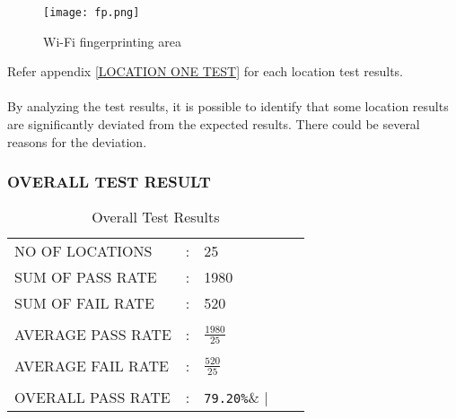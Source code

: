 \begin{figure*}[h]
	\centering
	\texttt{[image: fp.png]}
	\caption{Wi-Fi fingerprinting area}
\end{figure*}
Refer appendix \ref{LOCATION ONE TEST} for each location test results.

\paragraph{}
By analyzing the test results, it is possible to identify that some location results are significantly deviated from the expected results. There could be several reasons for the deviation.

\subsubsection{OVERALL TEST RESULT}
\begin{table}[H]
	\centering
	\label{OVERALL TEST RESULT}
	\begin{tabular}{lllll}
		NO OF LOCATIONS& :&  25&    \\
		SUM OF PASS RATE& :& 1980&  \\
		SUM OF FAIL RATE& :& 520&   \\\\
		AVERAGE PASS RATE& :& $\frac{1980}{25}$&   \\\\
		AVERAGE FAIL RATE& :& $\frac{520}{25}$&  \\\\
		OVERALL PASS RATE& :& \verb|79.20%|&   
	\end{tabular}
	\caption{Overall Test Results}
\end{table} 



